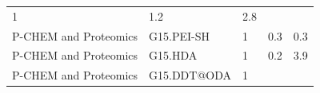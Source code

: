 \documentclass[utf8]{frontiersHLTH} %
\begin{document}
\begin{longtable}[]{@{}lllll@{}}
\begin{minipage}[t]{0.06\columnwidth}
1\strut
\end{minipage} & \begin{minipage}[t]{0.15\columnwidth}\raggedright\strut
1.2\strut
\end{minipage} & \begin{minipage}[t]{0.08\columnwidth}\raggedright\strut
2.8\strut
\end{minipage}\tabularnewline
\begin{minipage}[t]{0.26\columnwidth}\raggedright\strut
P-CHEM and Proteomics\strut
\end{minipage} & \begin{minipage}[t]{0.21\columnwidth}\raggedright\strut
G15.PEI-SH\strut
\end{minipage} & \begin{minipage}[t]{0.06\columnwidth}\raggedright\strut
1\strut
\end{minipage} & \begin{minipage}[t]{0.15\columnwidth}\raggedright\strut
0.3\strut
\end{minipage} & \begin{minipage}[t]{0.08\columnwidth}\raggedright\strut
0.3\strut
\end{minipage}\tabularnewline
\begin{minipage}[t]{0.26\columnwidth}\raggedright\strut
P-CHEM and Proteomics\strut
\end{minipage} & \begin{minipage}[t]{0.21\columnwidth}\raggedright\strut
G15.HDA\strut
\end{minipage} & \begin{minipage}[t]{0.06\columnwidth}\raggedright\strut
1\strut
\end{minipage} & \begin{minipage}[t]{0.15\columnwidth}\raggedright\strut
0.2\strut
\end{minipage} & \begin{minipage}[t]{0.08\columnwidth}\raggedright\strut
3.9\strut
\end{minipage}\tabularnewline
\begin{minipage}[t]{0.26\columnwidth}\raggedright\strut
P-CHEM and Proteomics\strut
\end{minipage} & \begin{minipage}[t]{0.21\columnwidth}\raggedright\strut
G15.DDT@ODA\strut
\end{minipage} & \begin{minipage}[t]{0.06\columnwidth}\raggedright\strut
1\strut
\end{minipage} & \begin{minipage}[t]{0.15\columnwidth}\raggedright\strut

\end{minipage}
\end{longtable}
\end{document}

